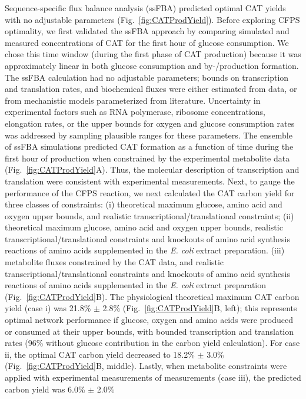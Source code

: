 \documentclass[12pt]{article}
\begin{document}
Sequence-specific flux balance analysis (ssFBA) predicted optimal CAT yields with no adjustable parameters (Fig.~\ref{fig:CATProdYield}).
Before exploring CFPS optimality, we first validated the ssFBA approach by comparing simulated and measured concentrations of CAT for the first hour of glucose consumption.
We chose this time window (during the first phase of CAT production) because it was approximately linear in both glucose consumption and by-/production formation.
The ssFBA calculation had no adjustable parameters; bounds on transcription and translation rates, and biochemical fluxes were either estimated from data, or
from mechanistic models parameterized from literature.
Uncertainty in experimental factors such as RNA polymerase, ribosome concentrations, elongation rates, or the upper bounds for oxygen and glucose consumption rates was addressed
by sampling plausible ranges for these parameters.
The ensemble of ssFBA simulations predicted CAT formation as a function of time during the first hour of production when constrained by the experimental metabolite data (Fig.~\ref{fig:CATProdYield}A).
Thus, the molecular description of transcription and translation were consistent with experimental measurements.
Next, to gauge the performance of the CFPS reaction, we next calculated the CAT carbon yield for three classes of constraints:
(i) theoretical maximum glucose, amino acid and oxygen upper bounds, and realistic transcriptional/translational constraints;
(ii) theoretical maximum glucose, amino acid and oxygen upper bounds, realistic transcriptional/translational constraints and knockouts of amino acid synthesis reactions of amino acids supplemented in the \textit{E. coli} extract preparation.  
(iii) metabolite fluxes constrained by the CAT data, and realistic transcriptional/translational constraints and knockouts of amino acid synthesis reactions of amino acids supplemented in the \textit{E. coli} extract preparation (Fig.~\ref{fig:CATProdYield}B).
The physiological theoretical maximum CAT carbon yield (case i) was 21.8\% $\pm$ 2.8\% (Fig.~\ref{fig:CATProdYield}B, left); this represents optimal network performance if glucose, oxygen and amino acids were produced or consumed at their upper bounds, with bounded transcription and translation rates (96\% without glucose contribution in the carbon yield calculation).
For case ii, the optimal CAT carbon yield decreased to 18.2\% $\pm$ 3.0\% (Fig.~\ref{fig:CATProdYield}B, middle).
Lastly, when metabolite constraints were applied with experimental measurements of measurements (case iii), the predicted carbon yield was 6.0\% $\pm$ 2.0\%
\end{document}
